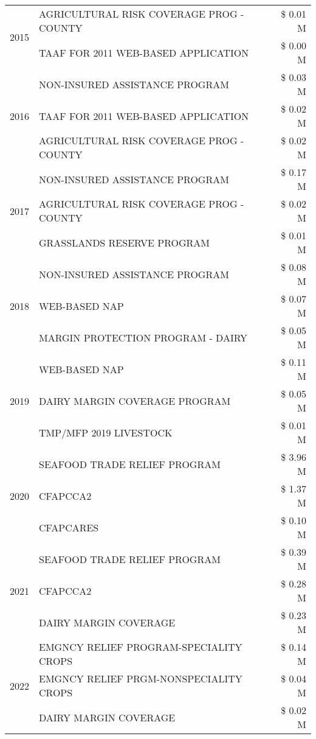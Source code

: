 \begin{tabular}{llr}
\cline{1-3}
\multirow[t]{2}{*}{2015} & AGRICULTURAL RISK COVERAGE PROG - COUNTY & \$ 0.01 M \\
 & TAAF FOR 2011 WEB-BASED APPLICATION & \$ 0.00 M \\
\cline{1-3}
\multirow[t]{3}{*}{2016} & NON-INSURED ASSISTANCE PROGRAM & \$ 0.03 M \\
 & TAAF FOR 2011 WEB-BASED APPLICATION & \$ 0.02 M \\
 & AGRICULTURAL RISK COVERAGE PROG - COUNTY & \$ 0.02 M \\
\cline{1-3}
\multirow[t]{3}{*}{2017} & NON-INSURED ASSISTANCE PROGRAM & \$ 0.17 M \\
 & AGRICULTURAL RISK COVERAGE PROG - COUNTY & \$ 0.02 M \\
 & GRASSLANDS RESERVE PROGRAM & \$ 0.01 M \\
\cline{1-3}
\multirow[t]{3}{*}{2018} & NON-INSURED ASSISTANCE PROGRAM & \$ 0.08 M \\
 & WEB-BASED NAP & \$ 0.07 M \\
 & MARGIN PROTECTION PROGRAM - DAIRY & \$ 0.05 M \\
\cline{1-3}
\multirow[t]{3}{*}{2019} & WEB-BASED NAP & \$ 0.11 M \\
 & DAIRY MARGIN COVERAGE PROGRAM & \$ 0.05 M \\
 & TMP/MFP 2019 LIVESTOCK & \$ 0.01 M \\
\cline{1-3}
\multirow[t]{3}{*}{2020} & SEAFOOD TRADE RELIEF PROGRAM & \$ 3.96 M \\
 & CFAPCCA2 & \$ 1.37 M \\
 & CFAPCARES & \$ 0.10 M \\
\cline{1-3}
\multirow[t]{3}{*}{2021} & SEAFOOD TRADE RELIEF PROGRAM & \$ 0.39 M \\
 & CFAPCCA2 & \$ 0.28 M \\
 & DAIRY MARGIN COVERAGE & \$ 0.23 M \\
\cline{1-3}
\multirow[t]{3}{*}{2022} & EMGNCY RELIEF PROGRAM-SPECIALITY CROPS & \$ 0.14 M \\
 & EMGNCY RELIEF PRGM-NONSPECIALITY CROPS & \$ 0.04 M \\
 & DAIRY MARGIN COVERAGE & \$ 0.02 M \\
\cline{1-3}
\bottomrule
\end{tabular}
